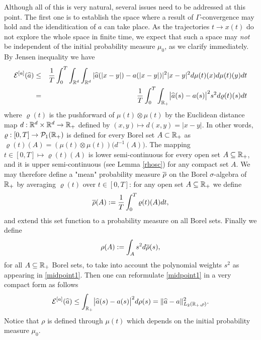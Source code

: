 Although all of this is very natural, several issues  need to be addressed at this point.
The first one is to establish the space where a result of $\Gamma$-convergence may hold and the idenditication of $a$ can take place.
As the trajectories $t\to x(t)$ do not explore the whole  space in finite time, we expect that such a space may {\it not} be independent of the initial probability measure $\mu_0$, as we clarify immediately.\\
By Jensen inequality we have
\begin{eqnarray}
\mathcal E^{[a]}(\widehat a)  &\leq & \frac{1}{T}\int_0^T  \int_{\mathbb{R}^d} \int_{\mathbb{R}^d}  | \widehat a(| x-y|) - a(| x-y|)|^2 | x-y|^2d \mu(t)(x) d \mu(t)(y) dt  \label{est-functional-1}\\
&= & \frac{1}{T}  \int_0^T\int_{\mathbb{R}_+}\bigl|\widehat a(s)-a(s)\bigr|^2 s^2d\varrho(t)(s) dt \label{midpoint1}
\end{eqnarray}
where $\varrho(t)$ is the pushforward of $\mu(t)\otimes\mu(t)$ by the Euclidean distance map
	$d:\mathbb{R}^d\times\mathbb{R}^d\rightarrow\mathbb{R}_+$ %
 	defined by $(x,y)\mapsto d(x,y)=|x-y|$. %
In other words, $\varrho:[0,T]\rightarrow \mathcal{P}_1(\mathbb{R}_+)$ is defined for every Borel set $A\subset\mathbb{R}_+$ as $\varrho(t)(A)=(\mu(t)\otimes\mu(t))\bigl(d^{-1}(A)\bigr)$.
The mapping $t \in [0,T] \mapsto\varrho(t)(A)$ is lower semi-continuous for every open set $A\subseteq\mathbb{R}_+$, and it is upper semi-continuous (see Lemma \ref{rhosc}) for any compact set $A$.
We may therefore define a "mean" probability measure $\overline\rho$ on the Borel $\sigma$-algebra of $\mathbb{R}_+$ by averaging $\varrho(t)$ over $t \in [0,T]$: for any open set $A \subseteq \mathbb{R}_+$ we define
\begin{align}\label{finallyrho}%
	\prerho(A):=\frac{1}{T}\int_0^T\varrho(t)(A)dt,
\end{align}
and extend this set function to a probability measure on all Borel sets. Finally we define
\begin{equation}
 \rho(A):=\int_A s^2 d\overline\rho(s),
 \label{rho}
\end{equation}
for all  $A\subseteq\mathbb{R}_+$ Borel sets, to take into account the polynomial weights $s^2$ as appearing in \eqref{midpoint1}.
Then one can reformulate \eqref{midpoint1} in a very compact form as follows
\begin{align}\label{midpoint2}
	\mathcal E^{[a]}(\widehat a)\leq \int_{\mathbb{R}_+}\bigl|\widehat a(s)-a(s)\bigr|^2 d \rho(s)
		=\| \widehat a - a \|^2_{L_2(\mathbb R_+,\rho)}.
\end{align}
Notice that $\rho$ is defined through $\mu(t)$ which depends on the initial probability measure $\mu_0$. 

